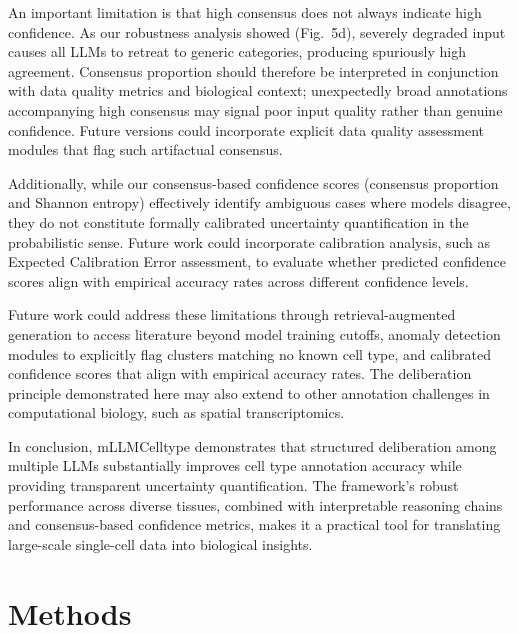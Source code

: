 \documentclass[pdflatex,sn-nature]{sn-jnl}%
\theoremstyle{thmstyleone}%
\theoremstyle{thmstyletwo}%
\theoremstyle{thmstylethree}%
\begin{document}
An important limitation is that high consensus does not always indicate high confidence. As our robustness analysis showed (Fig.~5d), severely degraded input causes all LLMs to retreat to generic categories, producing spuriously high agreement. Consensus proportion should therefore be interpreted in conjunction with data quality metrics and biological context; unexpectedly broad annotations accompanying high consensus may signal poor input quality rather than genuine confidence. Future versions could incorporate explicit data quality assessment modules that flag such artifactual consensus.

Additionally, while our consensus-based confidence scores (consensus proportion and Shannon entropy) effectively identify ambiguous cases where models disagree, they do not constitute formally calibrated uncertainty quantification in the probabilistic sense. Future work could incorporate calibration analysis, such as Expected Calibration Error assessment, to evaluate whether predicted confidence scores align with empirical accuracy rates across different confidence levels.

Future work could address these limitations through retrieval-augmented generation to access literature beyond model training cutoffs, anomaly detection modules to explicitly flag clusters matching no known cell type, and calibrated confidence scores that align with empirical accuracy rates. The deliberation principle demonstrated here may also extend to other annotation challenges in computational biology, such as spatial transcriptomics\cite{brbic2022stellar}.

In conclusion, mLLMCelltype demonstrates that structured deliberation among multiple LLMs substantially improves cell type annotation accuracy while providing transparent uncertainty quantification. The framework's robust performance across diverse tissues, combined with interpretable reasoning chains and consensus-based confidence metrics, makes it a practical tool for translating large-scale single-cell data into biological insights.

\section{Methods}\label{sec:methods}
\end{document}
